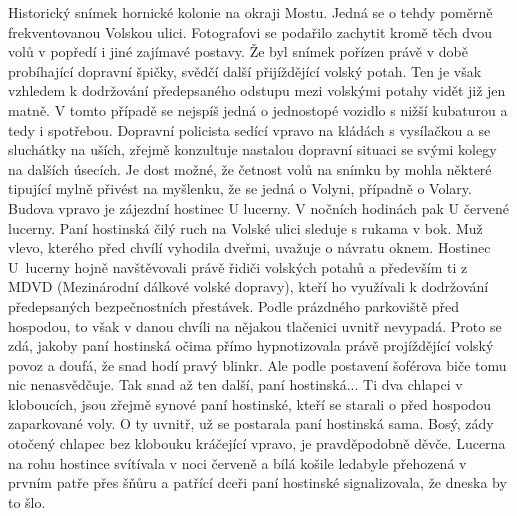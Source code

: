 
Historický snímek hornické kolonie na okraji Mostu. Jedná se o tehdy
poměrně frekventovanou Volskou ulici. Fotografovi se podařilo zachytit
kromě těch dvou volů v popředí i jiné zajímavé postavy. Že byl snímek
pořízen právě v době probíhající dopravní špičky, svědčí další
přijíždějící volský potah. Ten je však vzhledem k dodržování
předepsaného odstupu mezi volskými potahy vidět již jen matně. V tomto
případě se nejspíš jedná o jednostopé vozidlo s nižší kubaturou a tedy
i spotřebou. Dopravní policista sedící vpravo na kládách s vysílačkou
a se sluchátky na uších, zřejmě konzultuje nastalou dopravní situaci
se svými kolegy na dalších úsecích. Je dost možné, že četnost volů na
snímku by mohla některé tipující mylně přivést na myšlenku, že se
jedná o Volyni, případně o Volary. Budova vpravo je zájezdní hostinec
U lucerny. V nočních hodinách pak U červené lucerny. Paní hostinská
čilý ruch na Volské ulici sleduje s rukama v bok. Muž vlevo, kterého
před chvílí vyhodila dveřmi, uvažuje o návratu oknem. Hostinec
U~lucerny hojně navštěvovali právě řidiči volských potahů a především
ti z MDVD (Mezinárodní dálkové volské dopravy), kteří ho využívali k
dodržování předepsaných bezpečnostních přestávek. Podle prázdného
parkoviště před hospodou, to však v danou chvíli na nějakou tlačenici
uvnitř nevypadá. Proto se zdá, jakoby paní hostinská očima přímo
hypnotizovala právě projíždějící volský povoz a doufá, že snad hodí
pravý blinkr. Ale podle postavení šoférova biče tomu nic nenasvědčuje.
Tak snad až ten další, paní hostinská... Ti dva chlapci v kloboucích,
jsou zřejmě synové paní hostinské, kteří se starali o před hospodou
zaparkované voly. O ty uvnitř, už se postarala paní hostinská sama.
Bosý, zády otočený chlapec bez klobouku kráčející vpravo, je
pravděpodobně děvče. Lucerna na rohu hostince svítívala v noci červeně
a bílá košile ledabyle přehozená v prvním patře přes šňůru a patřící
dceři paní hostinské signalizovala, že dneska by to šlo.
